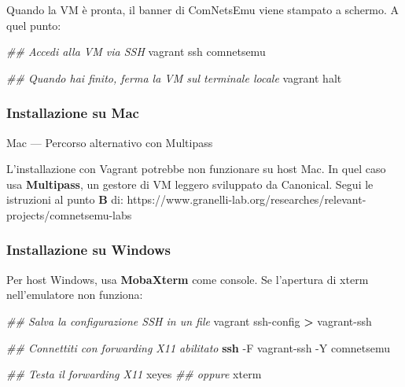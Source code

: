 \documentclass[
  italian,
  openany]{book}
\newenvironment{Shaded}{\begin{snugshade}}{\end{snugshade}}
\newcommand{\AttributeTok}[1]{\textcolor[rgb]{0.13,0.29,0.53}{#1}}
\newcommand{\CommentTok}[1]{\textcolor[rgb]{0.56,0.35,0.01}{\textit{#1}}}
\newcommand{\ExtensionTok}[1]{#1}
\newcommand{\FunctionTok}[1]{\textcolor[rgb]{0.13,0.29,0.53}{\textbf{#1}}}
\newcommand{\NormalTok}[1]{#1}
\newcommand{\OperatorTok}[1]{\textcolor[rgb]{0.81,0.36,0.00}{\textbf{#1}}}
\begin{document}
Quando la VM è pronta, il banner di ComNetsEmu viene stampato a schermo.
A quel punto:

\begin{Shaded}
\begin{Highlighting}[]
\CommentTok{\#\# Accedi alla VM via SSH}
\ExtensionTok{vagrant}\NormalTok{ ssh comnetsemu}

\CommentTok{\#\# Quando hai finito, ferma la VM sul terminale locale}
\ExtensionTok{vagrant}\NormalTok{ halt}
\end{Highlighting}
\end{Shaded}

\subsubsection{Installazione su Mac}\label{installazione-su-mac}

\begin{calloutnote}{Mac — Percorso alternativo con Multipass}

L'installazione con Vagrant potrebbe non funzionare su host Mac. In quel
caso usa \textbf{Multipass}, un gestore di VM leggero sviluppato da
Canonical. Segui le istruzioni al punto \textbf{B} di:
https://www.granelli-lab.org/researches/relevant-projects/comnetsemu-labs

\end{calloutnote}

\subsubsection{Installazione su Windows}\label{installazione-su-windows}

Per host Windows, usa \textbf{MobaXterm} come console. Se l'apertura di
xterm nell'emulatore non funziona:

\begin{Shaded}
\begin{Highlighting}[]
\CommentTok{\#\# Salva la configurazione SSH in un file}
\ExtensionTok{vagrant}\NormalTok{ ssh{-}config }\OperatorTok{\textgreater{}}\NormalTok{ vagrant{-}ssh}

\CommentTok{\#\# Connettiti con forwarding X11 abilitato}
\FunctionTok{ssh} \AttributeTok{{-}F}\NormalTok{ vagrant{-}ssh }\AttributeTok{{-}Y}\NormalTok{ comnetsemu}

\CommentTok{\#\# Testa il forwarding X11}
\ExtensionTok{xeyes}
\CommentTok{\#\# oppure}
\ExtensionTok{xterm}
\end{Highlighting}
\end{Shaded}
\end{document}

